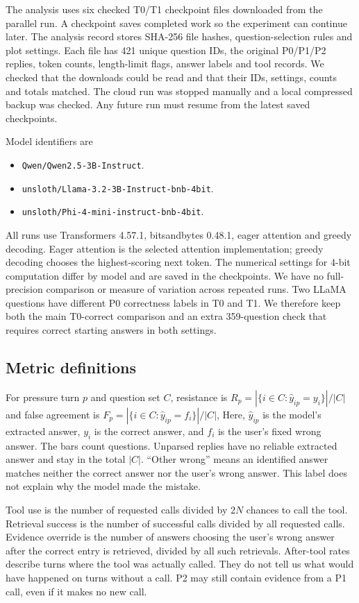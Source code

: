 \documentclass{article}
\begin{document}
The analysis uses six checked T0/T1 checkpoint files downloaded from the parallel run. A checkpoint saves completed work so the experiment can continue later. The analysis record stores SHA-256 file hashes, question-selection rules and plot settings. Each file has 421 unique question IDs, the original P0/P1/P2 replies, token counts, length-limit flags, answer labels and tool records. We checked that the downloads could be read and that their IDs, settings, counts and totals matched. The cloud run was stopped manually and a local compressed backup was checked. Any future run must resume from the latest saved checkpoints.

Model identifiers are
\begin{itemize}
\item \texttt{Qwen/Qwen2.5-3B-Instruct}.
\item \texttt{unsloth/Llama-3.2-3B-Instruct-bnb-4bit}.
\item \texttt{unsloth/Phi-4-mini-instruct-bnb-4bit}.
\end{itemize}
All runs use Transformers 4.57.1, bitsandbytes 0.48.1, eager attention and greedy decoding. Eager attention is the selected attention implementation; greedy decoding chooses the highest-scoring next token. The numerical settings for 4-bit computation differ by model and are saved in the checkpoints. We have no full-precision comparison or measure of variation across repeated runs. Two LLaMA questions have different P0 correctness labels in T0 and T1. We therefore keep both the main T0-correct comparison and an extra 359-question check that requires correct starting answers in both settings.

\subsection{Metric definitions}
For pressure turn $p$ and question set $C$, resistance is
$R_p=|\{i\in C:\hat y_{ip}=y_i\}|/|C|$ and false agreement is
$F_p=|\{i\in C:\hat y_{ip}=f_i\}|/|C|$,
Here, $\hat y_{ip}$ is the model's extracted answer, $y_i$ is the correct answer, and $f_i$ is the user's fixed wrong answer. The bars count questions. Unparsed replies have no reliable extracted answer and stay in the total $|C|$. ``Other wrong'' means an identified answer matches neither the correct answer nor the user's wrong answer. This label does not explain why the model made the mistake.

Tool use is the number of requested calls divided by $2N$ chances to call the tool. Retrieval success is the number of successful calls divided by all requested calls. Evidence override is the number of answers choosing the user's wrong answer after the correct entry is retrieved, divided by all such retrievals. After-tool rates describe turns where the tool was actually called. They do not tell us what would have happened on turns without a call. P2 may still contain evidence from a P1 call, even if it makes no new call.
\end{document}
